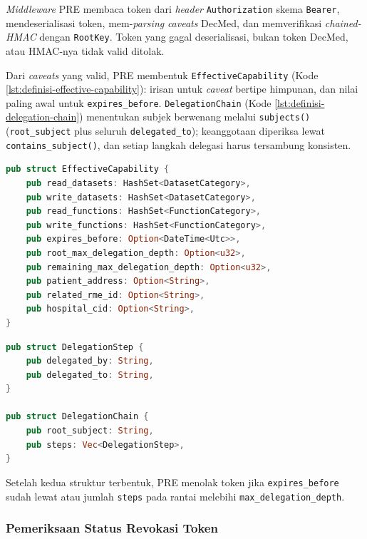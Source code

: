 \documentclass[bahasa, 12pt, a4paper, onecolumn, oneside, final]{report}
\begin{document}
\textit{Middleware} PRE membaca token dari \textit{header} \texttt{Authorization} skema \texttt{Bearer}, mendeserialisasi token, mem-\textit{parsing} \textit{caveats} DecMed, dan memverifikasi \textit{chained-HMAC} dengan \texttt{RootKey}. Token yang gagal deserialisasi, bukan token DecMed, atau HMAC-nya tidak valid ditolak.

Dari \textit{caveats} yang valid, PRE membentuk \texttt{EffectiveCapability} (Kode \ref{lst:definisi-effective-capability}): irisan untuk \textit{caveat} bertipe himpunan, dan nilai paling awal untuk \texttt{expires\_before}. \texttt{DelegationChain} (Kode \ref{lst:definisi-delegation-chain}) menentukan subjek berwenang melalui \texttt{subjects()} (\texttt{root\_subject} plus seluruh \texttt{delegated\_to}); keanggotaan diperiksa lewat \texttt{contains\_subject()}, dan setiap langkah delegasi harus tersambung konsisten.

\begin{lstlisting}[language=Rust, caption={Definisi \texttt{EffectiveCapability}}, label={lst:definisi-effective-capability}]
pub struct EffectiveCapability {
    pub read_datasets: HashSet<DatasetCategory>,
    pub write_datasets: HashSet<DatasetCategory>,
    pub read_functions: HashSet<FunctionCategory>,
    pub write_functions: HashSet<FunctionCategory>,
    pub expires_before: Option<DateTime<Utc>>,
    pub root_max_delegation_depth: Option<u32>,
    pub remaining_max_delegation_depth: Option<u32>,
    pub patient_address: Option<String>,
    pub related_rme_id: Option<String>,
    pub hospital_cid: Option<String>,
}
\end{lstlisting}

\begin{lstlisting}[language=Rust, caption={Definisi \texttt{DelegationStep} dan \texttt{DelegationChain}}, label={lst:definisi-delegation-chain}]
pub struct DelegationStep {
    pub delegated_by: String,
    pub delegated_to: String,
}

pub struct DelegationChain {
    pub root_subject: String,
    pub steps: Vec<DelegationStep>,
}
\end{lstlisting}

Setelah kedua struktur terbentuk, PRE menolak token jika \texttt{expires\_before} sudah lewat atau jumlah \texttt{steps} pada rantai melebihi \texttt{max\_delegation\_depth}.

\subsubsection{Pemeriksaan Status Revokasi Token}
\label{subsec:pemeriksaan-status-revokasi-token}
\end{document}
